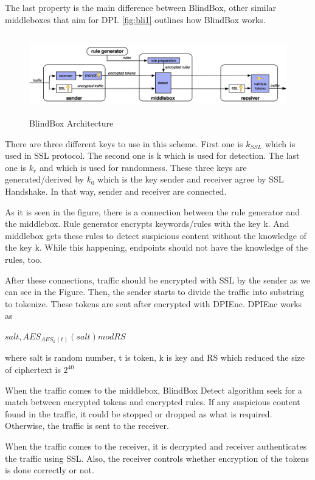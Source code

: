 \documentclass{winslabreport}
\begin{document}
The last property is the main difference between BlindBox, other similar middleboxes that aim for DPI. \autoref{fig:bli1} outlines how BlindBox works.

\begin{figure}[H]
	\centering
	\includegraphics[width=150mm,height=35mm]{blindbox.png}
	\caption{BlindBox Architecture}
	\label{fig:bli1}
\end{figure}

There are three different keys to use in this scheme. First one is $k_{SSL}$ which is used in SSL protocol. The second one is k which is used for detection. The last one is $k_r$ and which is used for randomness. These three keys are generated/derived by $k_0$ which is the key sender and receiver agree by SSL Handshake. In that way, sender and receiver are connected.

As it is seen in the figure, there is a connection between the rule generator and the middlebox. Rule generator encrypts keywords/rules with the key k. And middlebox gets these rules to detect suspicious content without the knowledge of the key k. While this happening, endpoints should not have the knowledge of the rules, too.

After these connections, traffic should be encrypted with SSL by the sender as we can see in the Figure. Then, the sender starts to divide the traffic into substring to tokenize. These tokens are sent after encrypted with DPIEnc. DPIEnc works as

\begin{center}
	$salt ,  AES_{AES_k (t)}(salt)  mod RS$
\end{center}

where salt is random number, t is token, k is key and  RS which reduced the size of ciphertext is $2^{40}$

When the traffic comes to the middlebox, BlindBox Detect algorithm seek for a match between encrypted tokens and encrypted rules. If any suspicious content found in the traffic, it could be stopped or dropped as what is required. Otherwise, the traffic is sent to the receiver.

When the traffic comes to the receiver, it is decrypted and receiver authenticates the traffic using SSL. Also, the receiver controls whether encryption of the tokens is done correctly or not. 
\end{document}
